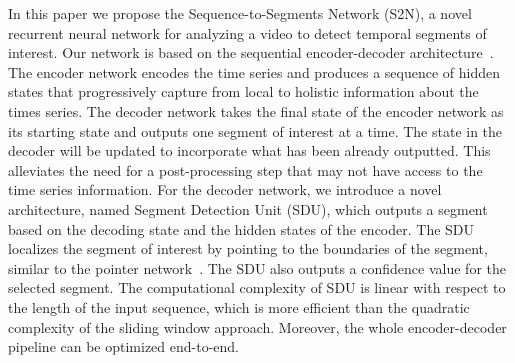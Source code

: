 \documentclass[10pt,journal,compsoc]{IEEEtran}
\begin{document}




In this paper we propose the Sequence-to-Segments Network (S2N), a novel recurrent neural network for analyzing a video to detect temporal segments of interest. Our network is based on the sequential encoder-decoder architecture~\cite{sutskever2014sequence}. The encoder network encodes the time series and produces a sequence of hidden states that progressively capture from local to holistic information about the times series. The decoder network takes the final state of the encoder network as its starting state and outputs one segment of interest at a time. The state in the decoder will be updated to incorporate what has been already outputted. This alleviates the need for a post-processing step that may not have access to the time series information. For the decoder network, we introduce a novel architecture, named Segment Detection Unit (SDU), which outputs a segment based on the decoding state and the hidden states of the encoder. The SDU localizes the segment of interest by pointing to the boundaries of the segment, similar to the pointer network~\cite{vinyals2015pointer}. The SDU also outputs a confidence value for the selected segment. The computational complexity of SDU is linear with respect to the length of the input sequence, which is more efficient than the quadratic complexity of the sliding window approach. Moreover, the whole encoder-decoder pipeline can be optimized end-to-end.
\end{document}
